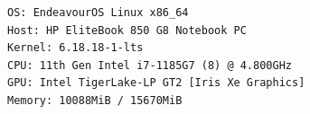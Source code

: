 \begin{lstlisting} 
OS: EndeavourOS Linux x86_64 
Host: HP EliteBook 850 G8 Notebook PC 
Kernel: 6.18.18-1-lts 
CPU: 11th Gen Intel i7-1185G7 (8) @ 4.800GHz 
GPU: Intel TigerLake-LP GT2 [Iris Xe Graphics] 
Memory: 10088MiB / 15670MiB
\end{lstlisting}